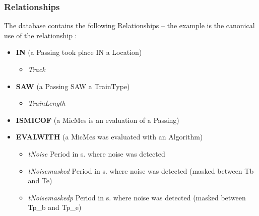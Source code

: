 \documentclass{article}\usepackage[]{graphicx}\usepackage[]{color}
\begin{document}
\subsubsection{Relationships} 
The database contains the following Relationships -- the example is the canonical use of the relationship :
\begin{itemize}
\item {\bf IN} (a Passing took place IN a Location)
  \begin{itemize}
    \item {\it Track}
  \end{itemize}
\item {\bf SAW} (a Passing SAW a TrainType)
  \begin{itemize}
    \item {\it TrainLength}
  \end{itemize}
\item {\bf ISMICOF} (a MicMes is an evaluation of a Passing)
\item {\bf EVALWITH} (a MicMes was evaluated with an Algorithm)
\begin{itemize}
\item {\it tNoise} Period in s. where noise was detected
    \item {\it tNoisemasked} Period in s. where noise was detected (masked between Tb and Te)
    \item {\it tNoisemaskedp} Period in s. where noise was detected (masked between Tp{\_}b and Tp{\_}e)
\end{itemize}
\end{itemize}
\end{document}
